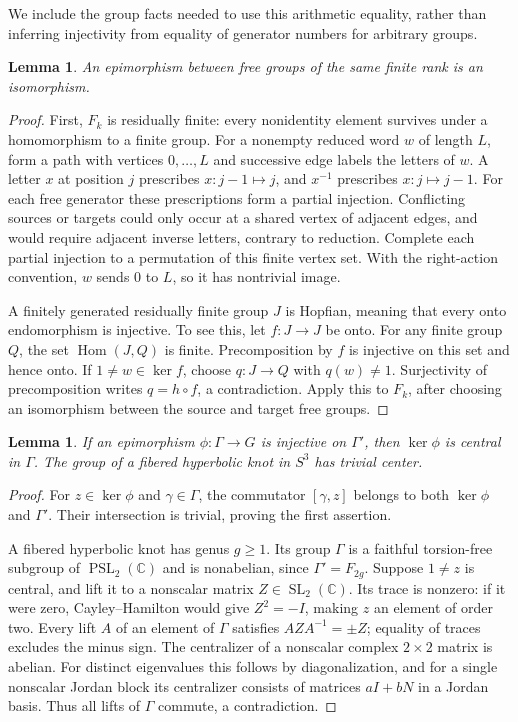 \documentclass[11pt]{article}
\newtheorem{lemma}[theorem]{Lemma}
\theoremstyle{remark}
\begin{document}
We include the group facts needed to use this arithmetic equality, rather than inferring injectivity from equality of generator numbers for arbitrary groups.

\begin{lemma}\label{lem:hopf}
An epimorphism between free groups of the same finite rank is an isomorphism.
\end{lemma}
\begin{proof}
First, $F_k$ is residually finite: every nonidentity element survives under a homomorphism to a finite group. For a nonempty reduced word $w$ of length $L$, form a path with vertices $0,\ldots,L$ and successive edge labels the letters of $w$. A letter $x$ at position $j$ prescribes $x:j-1\mapsto j$, and $x^{-1}$ prescribes $x:j\mapsto j-1$. For each free generator these prescriptions form a partial injection. Conflicting sources or targets could only occur at a shared vertex of adjacent edges, and would require adjacent inverse letters, contrary to reduction. Complete each partial injection to a permutation of this finite vertex set. With the right-action convention, $w$ sends $0$ to $L$, so it has nontrivial image.

A finitely generated residually finite group $J$ is Hopfian, meaning that every onto endomorphism is injective. To see this, let $f:J\to J$ be onto. For any finite group $Q$, the set $\operatorname{Hom}(J,Q)$ is finite. Precomposition by $f$ is injective on this set and hence onto. If $1\ne w\in\ker f$, choose $q:J\to Q$ with $q(w)\ne1$. Surjectivity of precomposition writes $q=h\circ f$, a contradiction. Apply this to $F_k$, after choosing an isomorphism between the source and target free groups.
\end{proof}

\begin{lemma}\label{lem:center}
If an epimorphism $\phi:\Gamma\to G$ is injective on $\Gamma'$, then $\ker\phi$ is central in $\Gamma$. The group of a fibered hyperbolic knot in $S^3$ has trivial center.
\end{lemma}
\begin{proof}
For $z\in\ker\phi$ and $\gamma\in\Gamma$, the commutator $[\gamma,z]$ belongs to both $\ker\phi$ and $\Gamma'$. Their intersection is trivial, proving the first assertion.

A fibered hyperbolic knot has genus $g\geq1$. Its group $\Gamma$ is a faithful torsion-free subgroup of $\operatorname{PSL}_2(\mathbb C)$ and is nonabelian, since $\Gamma'=F_{2g}$. Suppose $1\ne z$ is central, and lift it to a nonscalar matrix $Z\in\operatorname{SL}_2(\mathbb C)$. Its trace is nonzero: if it were zero, Cayley--Hamilton would give $Z^2=-I$, making $z$ an element of order two. Every lift $A$ of an element of $\Gamma$ satisfies $AZA^{-1}=\pm Z$; equality of traces excludes the minus sign. The centralizer of a nonscalar complex $2\times2$ matrix is abelian. For distinct eigenvalues this follows by diagonalization, and for a single nonscalar Jordan block its centralizer consists of matrices $aI+bN$ in a Jordan basis. Thus all lifts of $\Gamma$ commute, a contradiction.
\end{proof}
\end{document}
